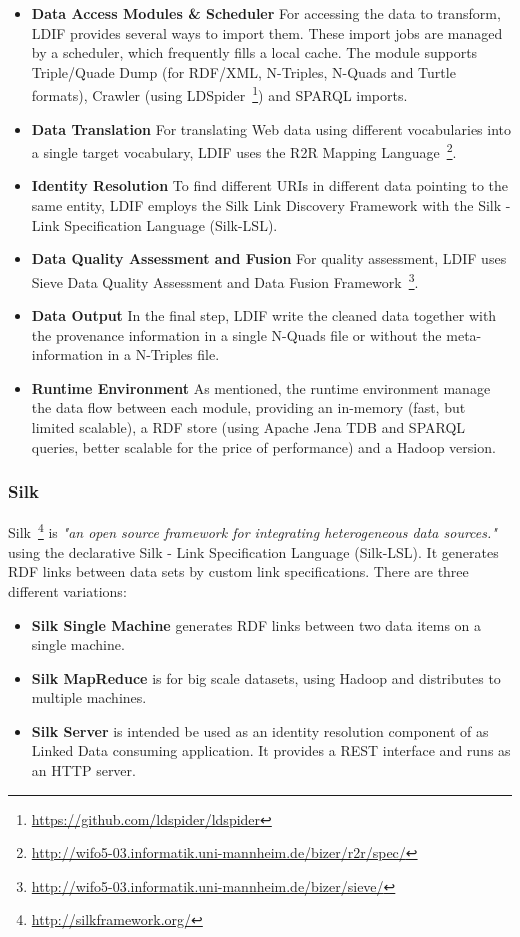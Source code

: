 \begin{itemize}
\item \textbf{Data Access Modules \& Scheduler}
For accessing the data to transform, LDIF provides several ways to import them. These import jobs are managed by a scheduler, which frequently fills a local cache. The module supports Triple/Quade Dump (for RDF/XML, N-Triples, N-Quads and Turtle formats), Crawler (using LDSpider~\footnote{\url{https://github.com/ldspider/ldspider}}) and SPARQL imports.
\item \textbf{Data Translation}
For translating Web data using different vocabularies into a single target vocabulary, LDIF uses the R2R Mapping Language~\footnote{\url{http://wifo5-03.informatik.uni-mannheim.de/bizer/r2r/spec/}}.
\item \textbf{Identity Resolution}
To find different URIs in different data pointing to the same entity, LDIF employs the Silk Link Discovery Framework with the Silk - Link Specification Language (Silk-LSL).
\item \textbf{Data Quality Assessment and Fusion}
For quality assessment, LDIF uses Sieve Data Quality Assessment and Data Fusion Framework~\footnote{\url{http://wifo5-03.informatik.uni-mannheim.de/bizer/sieve/}}.
\item \textbf{Data Output}
In the final step, LDIF write the cleaned data together with the provenance information in a single N-Quads file or without the meta-information in a N-Triples file.
\item \textbf{Runtime Environment} 
As mentioned, the runtime environment manage the data flow between each module, providing an in-memory (fast, but limited scalable), a RDF store (using Apache Jena TDB and SPARQL queries, better scalable for the price of performance) and a Hadoop version.
\end{itemize}

\subsubsection{Silk}\label{silk}
Silk~\footnote{\url{http://silkframework.org/}} is \emph{"an open source framework for integrating heterogeneous data sources."} using the declarative Silk - Link Specification Language (Silk-LSL). It generates RDF links between data sets by custom link specifications. There are three different variations:~\cite{isele2010silk}

\begin{itemize}
\item \textbf{Silk Single Machine} generates RDF links between two data items on a single machine.
\item \textbf{Silk MapReduce} is for big scale datasets, using Hadoop and distributes to multiple machines.
\item \textbf{Silk Server} is intended be used as an identity resolution component of as Linked Data consuming application. It provides a REST interface and runs as an HTTP server.
\end{itemize}

